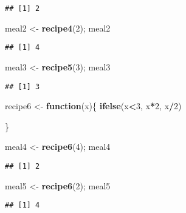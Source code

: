 \documentclass[]{article}
\newenvironment{Shaded}{\begin{snugshade}}{\end{snugshade}}
\newcommand{\KeywordTok}[1]{\textcolor[rgb]{0.13,0.29,0.53}{\textbf{#1}}}
\newcommand{\DecValTok}[1]{\textcolor[rgb]{0.00,0.00,0.81}{#1}}
\newcommand{\StringTok}[1]{\textcolor[rgb]{0.31,0.60,0.02}{#1}}
\newcommand{\ControlFlowTok}[1]{\textcolor[rgb]{0.13,0.29,0.53}{\textbf{#1}}}
\newcommand{\OperatorTok}[1]{\textcolor[rgb]{0.81,0.36,0.00}{\textbf{#1}}}
\newcommand{\NormalTok}[1]{#1}
\begin{document}
\begin{verbatim}
## [1] 2
\end{verbatim}

\begin{Shaded}
\begin{Highlighting}[]
\NormalTok{meal2 <-}\StringTok{ }\KeywordTok{recipe4}\NormalTok{(}\DecValTok{2}\NormalTok{); meal2}
\end{Highlighting}
\end{Shaded}

\begin{verbatim}
## [1] 4
\end{verbatim}

\begin{Shaded}
\begin{Highlighting}[]
\NormalTok{meal3 <-}\StringTok{ }\KeywordTok{recipe5}\NormalTok{(}\DecValTok{3}\NormalTok{); meal3}
\end{Highlighting}
\end{Shaded}

\begin{verbatim}
## [1] 3
\end{verbatim}

\begin{Shaded}
\begin{Highlighting}[]
\NormalTok{recipe6 <-}\StringTok{ }\ControlFlowTok{function}\NormalTok{(x)\{}
  \KeywordTok{ifelse}\NormalTok{(x}\OperatorTok{<}\DecValTok{3}\NormalTok{, x}\OperatorTok{*}\DecValTok{2}\NormalTok{, x}\OperatorTok{/}\DecValTok{2}\NormalTok{)}
  
\NormalTok{\}}

\NormalTok{meal4 <-}\StringTok{ }\KeywordTok{recipe6}\NormalTok{(}\DecValTok{4}\NormalTok{); meal4}
\end{Highlighting}
\end{Shaded}

\begin{verbatim}
## [1] 2
\end{verbatim}

\begin{Shaded}
\begin{Highlighting}[]
\NormalTok{meal5 <-}\StringTok{ }\KeywordTok{recipe6}\NormalTok{(}\DecValTok{2}\NormalTok{); meal5}
\end{Highlighting}
\end{Shaded}

\begin{verbatim}
## [1] 4
\end{verbatim}
\end{document}
